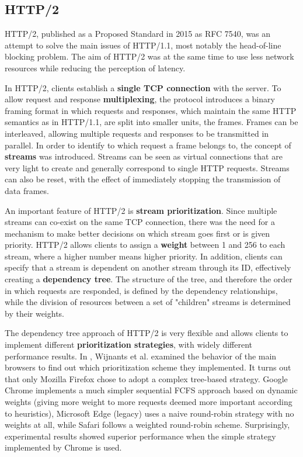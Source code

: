 \subsection{HTTP/2}
\label{sec:bg/http2}

HTTP/2, published as a Proposed Standard in 2015 as RFC 7540, was an attempt to solve the main issues of HTTP/1.1, most notably the head-of-line blocking problem. The aim of HTTP/2 was at the same time to use less network resources while reducing the perception of latency.\cite{http2}

In HTTP/2, clients establish a \textbf{single TCP connection} with the server. To allow request and response \textbf{multiplexing}, the protocol introduces a binary framing format in which requests and responses, which maintain the same HTTP semantics as in HTTP/1.1, are split into smaller units, the frames. Frames can be interleaved, allowing multiple requests and responses to be transmitted in parallel. In order to identify to which request a frame belongs to, the concept of \textbf{streams} was introduced. Streams can be seen as virtual connections that are very light to create and generally correspond to single HTTP requests. Streams can also be reset, with the effect of immediately stopping the transmission of data frames.

An important feature of HTTP/2 is \textbf{stream prioritization}. Since multiple streams can co-exist on the same TCP connection, there was the need for a mechanism to make better decisions on which stream goes first or is given priority. HTTP/2 allows clients to assign a \textbf{weight} between 1 and 256 to each stream, where a higher number means higher priority. In addition, clients can specify that a stream is dependent on another stream through its ID, effectively creating a \textbf{dependency tree}. The structure of the tree, and therefore the order in which requests are responded, is defined by the dependency relationships, while the division of resources between a set of "children" streams is determined by their weights.

The dependency tree approach of HTTP/2 is very flexible and allows clients to implement different \textbf{prioritization strategies}, with widely different performance results. In \cite{http2pri}, Wijnants et al. examined the behavior of the main browsers to find out which prioritization scheme they implemented. It turns out that only Mozilla Firefox chose to adopt a complex tree-based strategy. Google Chrome implements a much simpler sequential FCFS approach based on dynamic weights (giving more weight to more requests deemed more important according to heuristics), Microsoft Edge (legacy) uses a naive round-robin strategy with no weights at all, while Safari follows a weighted round-robin scheme. Surprisingly, experimental results showed superior performance when the simple strategy implemented by Chrome is used.

